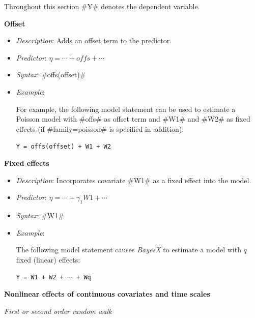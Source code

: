 Throughout this section #Y# denotes the dependent variable.

{\bf Offset}
\medskip

\begin{itemize}
\item[] {\em Description}: Adds an offset term to the predictor.
\item[] {\em Predictor}: $\eta =  \cdots + offs + \cdots$
\item[] {\em Syntax}: #offs(offset)#
\item[] {\em Example}:

For example, the following model statement can be used to estimate
a Poisson model with #offs# as offset term and #W1# and #W2# as
fixed effects (if #family=poisson# is specified in addition):

\texttt{Y = offs(offset) + W1 + W2}

\end{itemize}

\newpage

{\bf Fixed effects}
\medskip

\begin{itemize}
\item[] {\em Description}: Incorporates covariate #W1# as a fixed effect into the model.
\item[] {\em Predictor}: $\eta =  \cdots + \gamma_1 W1 + \cdots$
\item[] {\em Syntax}: #W1#
\item[] {\em Example}:

The following model statement causes {\em BayesX} to estimate a
model with $q$ fixed (linear) effects:

\texttt{Y = W1 + W2 + $\cdots$ + Wq}
\end{itemize}


{\bf Nonlinear effects of continuous covariates and time scales}
\medskip

{\em First or second order random walk}

